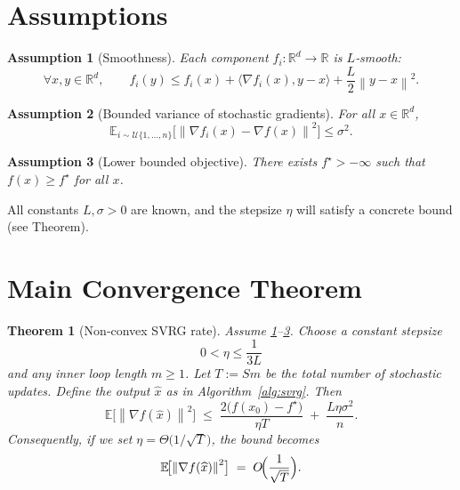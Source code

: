 \documentclass{article}
\newtheorem{theorem}{Theorem}
\newtheorem{assumption}{Assumption}
\newcommand{\E}{\mathbb{E}}
\newcommand{\R}{\mathbb{R}}
\newcommand{\norm}[1]{\left\|#1\right\|}
\newcommand{\inner}[2]{\langle #1,#2\rangle}
\newcommand{\grad}{\nabla}
\begin{document}
\section*{Assumptions}
\begin{assumption}[Smoothness]\label{ass:smooth}
Each component $f_i:\R^d\to\R$ is $L$‑smooth:
\[
\forall x,y\in\R^d,\qquad 
f_i(y)\le f_i(x)+\inner{\grad f_i(x)}{y-x}+\frac{L}{2}\norm{y-x}^2 .
\tag{A1}
\]
\end{assumption}
\begin{assumption}[Bounded variance of stochastic gradients]\label{ass:var}
For all $x\in\R^d$,
\[
\E_{i\sim\mathcal U\{1,\dots,n\}}\!\bigl[\norm{\grad f_i(x)-\grad f(x)}^2\bigr]\le\sigma^2 .
\tag{A2}
\]
\end{assumption}
\begin{assumption}[Lower bounded objective]\label{ass:lb}
There exists $f^\star>-\infty$ such that $f(x)\ge f^\star$ for all $x$.
\end{assumption}
All constants $L,\sigma>0$ are known, and the stepsize $\eta$ will satisfy a concrete bound (see Theorem).

\section*{Main Convergence Theorem}
\begin{theorem}[Non‑convex SVRG rate]\label{thm:svrg}
Assume \ref{ass:smooth}–\ref{ass:lb}. Choose a constant stepsize
\[
0<\eta\le\frac{1}{3L}
\tag{4}
\]
and any inner loop length $m\ge1$. Let $T:=Sm$ be the total number of stochastic updates.  
Define the output $\widehat{x}$ as in Algorithm~\ref{alg:svrg}. Then
\[
\E\!\bigl[\norm{\grad f(\widehat{x})}^2\bigr]\;
\le\;
\frac{2\bigl(f(x_0)-f^\star\bigr)}{\eta T}
\;+\;
\frac{L\eta\sigma^2}{n}.
\tag{5}
\]
Consequently, if we set $\eta = \Theta\!\bigl(1/\sqrt{T}\bigr)$, the bound becomes
\[
\E\!\bigl[\norm{\grad f(\widehat{x})}^2\bigr]\;=\;O\!\Bigl(\frac{1}{\sqrt{T}}\Bigr).
\]
\end{theorem}

\end{document}
